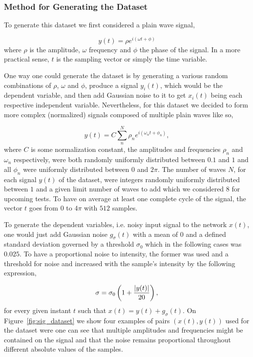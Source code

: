 \subsubsection{Method for Generating the Dataset}
To generate this dataset we first considered a plain wave signal,

\begin{equation}
	y(t) = \rho e^{i(\omega t + \phi)}
\end{equation}
where $ \rho $ is the amplitude, $ \omega $ frequency and $ \phi $ the phase of the signal. In a more practical sense, $ t $ is the sampling vector or simply the time variable.

One way one could generate the dataset is by generating a various random combinations of $ \rho $, $ \omega $ and $ \phi $, produce a signal $ y_i(t) $, which would be the dependent variable, and then add Gaussian noise to it to get $ x_i(t) $ being each respective independent variable. Nevertheless, for this dataset we decided to form more complex (normalized) signals composed of multiple plain waves like so,

\begin{equation}
	y(t) = C \sum_n^{N} \rho_n e^{i(\omega_n t + \phi_n)},
\end{equation}
where $ C $ is some normalization constant, the amplitudes and frequencies $ \rho_n $ and $ \omega_n $ respectively, were both randomly uniformly distributed between $ 0.1 $ and $ 1 $ and all $ \phi_n $ were uniformly distributed between $ 0 $ and $ 2\pi $. The number of waves $ N $, for each signal $ y(t) $ of the dataset, were integers randomly uniformly distributed between $ 1 $ and a given limit number of waves to add which we considered $ 8 $ for upcoming tests. To have on average at least one complete cycle of the signal, the vector $  t $ goes from $ 0 $ to $ 4\pi $ with $ 512 $ samples.

To generate the dependent variables, i.e. noisy input signal to the network $ x(t) $, one would just add Gaussian noise $ g_\sigma(t) $ with a mean of $ 0 $ and a defined standard deviation governed by a threshold $ \sigma_0 $ which in the following cases was $ 0.025 $. To have a proportional noise to intensity, the former was used and a threshold for noise and increased with the sample's intensity by the following expression,

\begin{equation}
	\sigma = \sigma_0 \left( 1 + \dfrac{\left| y(t) \right|}{20} \right),
\end{equation}
for every given instant $ t $ such that $ x(t) = y(t) + g_\sigma(t) $. On Figure~\ref{fig:sig_dataset} we show four examples of pairs $ (x(t), y(t)) $ used for the dataset were one can see that multiple amplitudes and frequencies might be contained on the signal and that the noise remains proportional throughout different absolute values of the samples.

